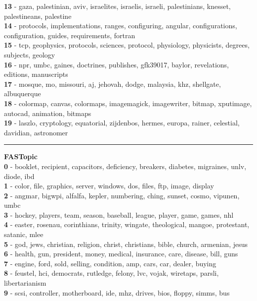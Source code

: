\textbf{13} - gaza, palestinian, aviv, israelites, israelis, israeli, palestinians, knesset, palestineans, palestine\\
\textbf{14} - protocols, implementations, ranges, configuring, angular, configurations, configuration, guides, requirements, fortran\\
\textbf{15} - tcp, geophysics, protocols, sciences, protocol, physiology, physicists, degrees, subjects, geology\\
\textbf{16} - npr, umbc, gaines, doctrines, publishes, gfk39017, baylor, revelations, editions, manuscripts\\
\textbf{17} - mosque, mo, missouri, aj, jehovah, dodge, malaysia, khz, shellgate, albuquerque\\
\textbf{18} - colormap, canvas, colormaps, imagemagick, imagewriter, bitmap, xputimage, autocad, animation, bitmaps\\
\textbf{19} - laszlo, cryptology, equatorial, zijdenbos, hermes, europa, rainer, celestial, davidian, astronomer\\
\hrule\vspace{2mm}
\noindent
\textbf{FASTopic}\vspace{2mm}\\
\vspace{2mm}
\noindent
\textbf{0} - booklet, recipient, capacitors, deficiency, breakers, diabetes, migraines, unlv, diode, ibd\\
\textbf{1} - color, file, graphics, server, windows, dos, files, ftp, image, display\\
\textbf{2} - angmar, bigwpi, alfalfa, kepler, numbering, ching, sunset, cosmo, vipunen, umbc\\
\textbf{3} - hockey, players, team, season, baseball, league, player, game, games, nhl\\
\textbf{4} - easter, rosenau, corinthians, trinity, wingate, theological, mangoe, protestant, satanic, mlee\\
\textbf{5} - god, jews, christian, religion, christ, christians, bible, church, armenian, jesus\\
\textbf{6} - health, gun, president, money, medical, insurance, care, disease, bill, guns\\
\textbf{7} - engine, ford, sold, selling, condition, amp, cars, car, dealer, buying\\
\textbf{8} - feustel, hci, democrats, rutledge, felony, lvc, vojak, wiretaps, parsli, libertarianism\\
\textbf{9} - scsi, controller, motherboard, ide, mhz, drives, bios, floppy, simms, bus\\
